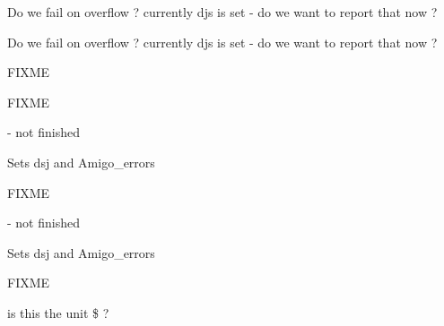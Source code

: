 
\begin{DoxyRefList}
\item[\label{todo__todo000004}%
\hypertarget{todo__todo000004}{}%
Global \hyperlink{amigo_8h_a4934ae332e168979dbb865a9948de88b}{amigo\+\_\+buffered\+\_\+read} (void)]Do we fail on overflow ? currently djs is set -\/ do we want to report that now ?  
\item[\label{todo__todo000004}%
\hypertarget{todo__todo000004}{}%
Global \hyperlink{amigo_8h_a4934ae332e168979dbb865a9948de88b}{amigo\+\_\+buffered\+\_\+read} (void)]Do we fail on overflow ? currently djs is set -\/ do we want to report that now ?  
\item[\label{todo__todo000007}%
\hypertarget{todo__todo000007}{}%
Global \hyperlink{amigo_8h_ae61925e6fb971862b8b0390c67bc164c}{amigo\+\_\+cmd\+\_\+clear} (void)]F\+I\+X\+ME 
\item[\label{todo__todo000007}%
\hypertarget{todo__todo000007}{}%
Global \hyperlink{amigo_8h_ae61925e6fb971862b8b0390c67bc164c}{amigo\+\_\+cmd\+\_\+clear} (void)]F\+I\+X\+ME 
\item[\label{todo__todo000005}%
\hypertarget{todo__todo000005}{}%
Global \hyperlink{amigo_8h_a1893674c480c08927066d7e10029d01c}{amigo\+\_\+cmd\+\_\+wakeup} (void)]-\/ not finished
\begin{DoxyItemize}
\item Sets dsj and Amigo\+\_\+errors
\end{DoxyItemize}

F\+I\+X\+ME  
\item[\label{todo__todo000005}%
\hypertarget{todo__todo000005}{}%
Global \hyperlink{amigo_8h_a1893674c480c08927066d7e10029d01c}{amigo\+\_\+cmd\+\_\+wakeup} (void)]-\/ not finished
\begin{DoxyItemize}
\item Sets dsj and Amigo\+\_\+errors
\end{DoxyItemize}

F\+I\+X\+ME  
\item[\label{todo__todo000008}%
\hypertarget{todo__todo000008}{}%
Global \hyperlink{amigo_8h_a2fc6f1413199d33d2b32e675dd45e181}{Amigo\+\_\+\+Command} (int secondary)]is this the unit \$ ? 


\end{DoxyRefList}
